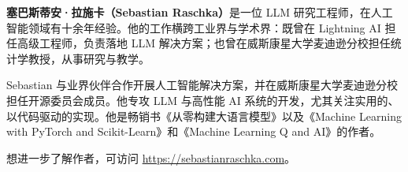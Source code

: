 
\textbf{塞巴斯蒂安·拉施卡（Sebastian Raschka）}是一位 LLM 研究工程师，在人工智能领域有十余年经验。他的工作横跨工业界与学术界：既曾在 Lightning AI 担任高级工程师，负责落地 LLM 解决方案；也曾在威斯康星大学麦迪逊分校担任统计学教授，从事研究与教学。

Sebastian 与业界伙伴合作开展人工智能解决方案，并在威斯康星大学麦迪逊分校担任开源委员会成员。他专攻 LLM 与高性能 AI 系统的开发，尤其关注实用的、以代码驱动的实现。他是畅销书《从零构建大语言模型》以及《Machine Learning with PyTorch and Scikit-Learn》和《Machine Learning Q and AI》的作者。

想进一步了解作者，可访问 \href{https://sebastianraschka.com}{https://sebastianraschka.com}。
